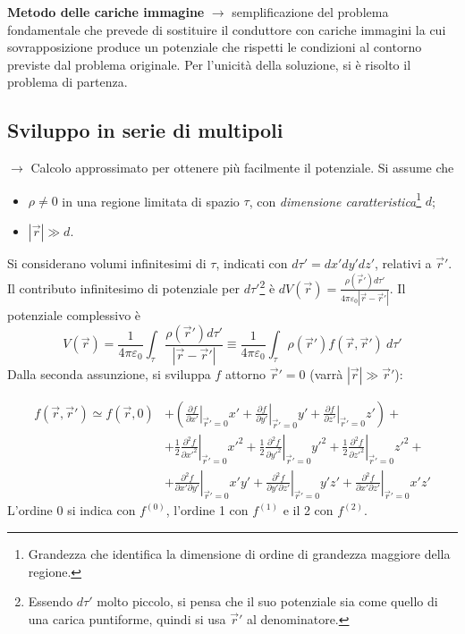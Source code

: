 \documentclass[a4paper]{scrartcl}
\newcommand*\Eval[3]{\left.#1\right\rvert_{#2}^{#3}}
\numberwithin{equation}{subsection}
\theoremstyle{style1}
\newenvironment{boxenv}[1][]{
    \begin{eqbox}[#1]
    }{
   \end{eqbox}
}
\begin{document}
\textbf{Metodo delle cariche immagine} $\to$ semplificazione del problema fondamentale che prevede di sostituire il conduttore con cariche immagini la cui sovrapposizione produce un potenziale che rispetti le condizioni al contorno previste dal problema originale. Per l'unicit\`a della soluzione, si \`e risolto il problema di partenza. 

\subsection{Sviluppo in serie di multipoli}

$\to$ Calcolo approssimato per ottenere pi\`u facilmente il potenziale. Si assume che
\begin{itemize}
	\item $\rho \neq 0$ in una regione limitata di spazio $\tau $, con \textit{dimensione caratteristica}\footnote{Grandezza che identifica la dimensione di ordine di grandezza maggiore della regione.} $d$;
	\item $\left\lvert \vec{r} \right\rvert \gg d$.
\end{itemize}
Si considerano volumi infinitesimi di $\tau $, indicati con $d\tau '=dx'dy'dz'$, relativi a $\vec{r}'$. Il contributo infinitesimo di potenziale per $d\tau '$\footnote{Essendo $d\tau '$ molto piccolo, si pensa che il suo potenziale sia come quello di una carica puntiforme, quindi si usa $\vec{r}'$ al denominatore.} \`e $dV(\vec{r}) = \frac{\rho (\vec{r}') d\tau '}{4\pi \varepsilon _0 \left\lvert \vec{r}- \vec{r}' \right\rvert }$. Il potenziale complessivo \`e
\begin{equation}
	V(\vec{r}) = \frac{1}{4\pi \varepsilon _0} \int_{\tau } \frac{\rho (\vec{r}') d\tau '}{\left\lvert \vec{r}- \vec{r}' \right\rvert }\equiv \frac{1}{4\pi \varepsilon _0} \int_{\tau } \rho (\vec{r}') f(\vec{r},\vec{r}') \ d\tau '
\end{equation}
Dalla seconda assunzione, si sviluppa $f$ attorno $\vec{r}' = 0$ (varr\`a $\left\lvert \vec{r} \right\rvert \gg\vec{r}'$):
\begin{boxenv}[]
\begin{equation}
\begin{split}
	f(\vec{r},\vec{r}') \simeq f(\vec{r},0) &+\left(\Eval{\frac{\partial f}{\partial x'} }{\vec{r}' = 0}{}x'+ \Eval{\frac{\partial f}{\partial y'} }{\vec{r}' = 0}{}y'+ \Eval{\frac{\partial f}{\partial z'} }{\vec{r}' = 0}{}z'\right) +\\
				   &+\frac{1}{2}\Eval{\frac{\partial ^2f}{\partial x'^2} }{\vec{r}' = 0}{}x'^2+\frac{1}{2}\Eval{\frac{\partial ^2f}{\partial y'^2} }{\vec{r}' = 0}{}y'^2+\frac{1}{2}\Eval{\frac{\partial ^2f}{\partial z'^2} }{\vec{r}' = 0}{}z'^2+\\
				   &+\Eval{\frac{\partial ^2 f}{\partial x'\partial y'} }{\vec{r}'=0}{}x'y'+\Eval{\frac{\partial ^2 f}{\partial y'\partial z'} }{\vec{r}'=0}{}y'z'+\Eval{\frac{\partial ^2 f}{\partial x'\partial z'} }{\vec{r}'=0}{}x'z'
\end{split}
\end{equation}
\noindent L'ordine 0 si indica con $f^{(0)} $, l'ordine 1 con $f^{(1)} $ e il 2 con $f^{(2)} $.
\end{boxenv}
\end{document}
